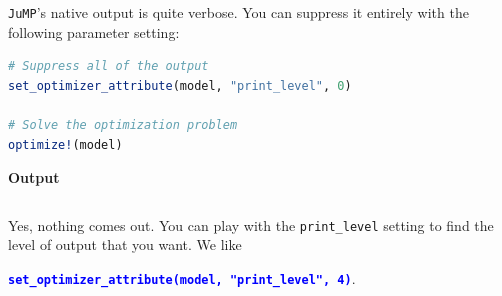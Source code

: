 \texttt{JuMP}'s native output is quite verbose. You can suppress it entirely with the following parameter setting:\\
\begin{lstlisting}[language=Julia,style=mystyle]
# Suppress all of the output
set_optimizer_attribute(model, "print_level", 0)

# Solve the optimization problem
optimize!(model)
\end{lstlisting}
\textbf{Output} 
\begin{verbatim}

\end{verbatim}
\bigskip
Yes, nothing comes out. You can play with the \texttt{print\_level} setting to find the level of output that you want. We like
\begin{center}
\textcolor{blue}{\texttt{\bf set\_optimizer\_attribute(model, "print\_level", 4)}}.
\end{center}
\bigskip

